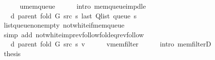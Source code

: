 \begin{isabellebody}
\ \ \ \ \isamarkupfalse%
\ u{\isacharunderscore}{\kern0pt}mem{\isacharunderscore}{\kern0pt}queue\isanewline
\ \ \ \ \isamarkupfalse%
\ {\isacharparenleft}{\kern0pt}intro\ mem{\isacharunderscore}{\kern0pt}queue{\isacharunderscore}{\kern0pt}imp{\isacharunderscore}{\kern0pt}d{\isacharunderscore}{\kern0pt}le{\isacharparenright}{\kern0pt}\isanewline
\ \ \isamarkupfalse%
\ \isamarkupfalse%
\ {\isachardoublequoteopen}{\isachardot}{\kern0pt}{\isachardot}{\kern0pt}{\isachardot}{\kern0pt}\ {\isacharequal}{\kern0pt}\ d\ {\isacharparenleft}{\kern0pt}parent\ {\isacharparenleft}{\kern0pt}fold\ G\ src\ s{\isacharparenright}{\kern0pt}{\isacharparenright}{\kern0pt}\ {\isacharparenleft}{\kern0pt}last\ {\isacharparenleft}{\kern0pt}Q{\isacharunderscore}{\kern0pt}list\ {\isacharparenleft}{\kern0pt}queue\ s{\isacharparenright}{\kern0pt}{\isacharparenright}{\kern0pt}{\isacharparenright}{\kern0pt}{\isachardoublequoteclose}\isanewline
\ \ \ \ \isamarkupfalse%
\ list{\isacharunderscore}{\kern0pt}queue{\isacharunderscore}{\kern0pt}non{\isacharunderscore}{\kern0pt}empty\ not{\isacharunderscore}{\kern0pt}white{\isacharunderscore}{\kern0pt}if{\isacharunderscore}{\kern0pt}mem{\isacharunderscore}{\kern0pt}queue\isanewline
\ \ \ \ \isamarkupfalse%
\ {\isacharparenleft}{\kern0pt}simp\ add{\isacharcolon}{\kern0pt}\ not{\isacharunderscore}{\kern0pt}white{\isacharunderscore}{\kern0pt}imp{\isacharunderscore}{\kern0pt}rev{\isacharunderscore}{\kern0pt}follow{\isacharunderscore}{\kern0pt}fold{\isacharunderscore}{\kern0pt}eq{\isacharunderscore}{\kern0pt}rev{\isacharunderscore}{\kern0pt}follow{\isacharparenright}{\kern0pt}\isanewline
\ \ \isamarkupfalse%
\ \isamarkupfalse%
\ {\isachardoublequoteopen}{\isachardot}{\kern0pt}{\isachardot}{\kern0pt}{\isachardot}{\kern0pt}\ {\isasymle}\ d\ {\isacharparenleft}{\kern0pt}parent\ {\isacharparenleft}{\kern0pt}fold\ G\ src\ s{\isacharparenright}{\kern0pt}{\isacharparenright}{\kern0pt}\ v{\isachardoublequoteclose}\isanewline
\ \ \ \ \isamarkupfalse%
\ v{\isacharunderscore}{\kern0pt}mem{\isacharunderscore}{\kern0pt}filter\isanewline
\ \ \ \ \isamarkupfalse%
\ {\isacharparenleft}{\kern0pt}intro\ mem{\isacharunderscore}{\kern0pt}filterD{\isacharparenleft}{\kern0pt}{}{\isacharparenright}{\kern0pt}{\isacharparenright}{\kern0pt}\isanewline
\ \ \isamarkupfalse%
\ \isamarkupfalse%
\ {\isacharquery}{\kern0pt}thesis\isanewline
\ \ \ \ \isacommand{{\isachardot}{\kern0pt}}\isamarkupfalse%

\end{isabellebody}
